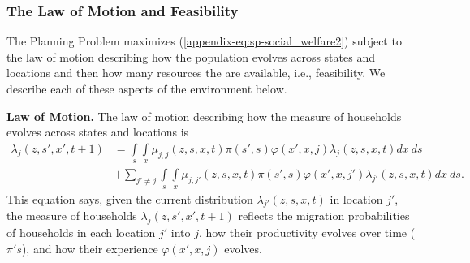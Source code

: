 \documentclass[12pt,pdftex]{article}
\begin{document}
\begin{onehalfspacing}
\subsubsection{The Law of Motion and Feasibility}

The Planning Problem maximizes (\ref{appendix-eq:sp-social_welfare2}) subject to the law of motion describing how the population evolves across states and locations and then how many resources the are available, i.e., feasibility. We describe each of these aspects of the environment below.

\textbf{Law of Motion.} The law of motion describing how the measure of households evolves across states and locations is
\begin{align}
\lambda_{j}(z, s', x', t+1)  & =  \int\limits_{s} \int\limits_{x}  \mu_{j,j}(z, s,x,t)\pi(s',s) \varphi(x',x, j) \lambda_{j}(z, s, x, t)  dx \ ds   \  \label{appendix-eq:planner_law_motion} \\
& +  \sum_{j' \neq j} \int\limits_{s} \int\limits_{x} \mu_{j,j'}(z, s,x,t) \pi(s',s) \varphi(x',x, j') \lambda_{j'}(z, s, x, t)  dx \ ds. \nonumber
\end{align}
This equation says, given the current distribution $\lambda_{j'}(z, s, x, t)$ in location $j'$, the measure of households $\lambda_{j}(z, s', x', t+1)$ reflects the migration probabilities of households in each location $j'$ into $j$, how their productivity evolves over time ($\pi's$), and how their experience $\varphi(x',x, j)$ evolves.


\end{onehalfspacing}
\end{document}
